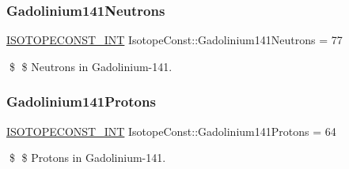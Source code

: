 \subsubsection{\texorpdfstring{Gadolinium141\+Neutrons}{Gadolinium141Neutrons}}
{\footnotesize\ttfamily \mbox{\hyperlink{group___isotope_const-_macros_ga5f18360b3e99483a35c32d789e62621c}{I\+S\+O\+T\+O\+P\+E\+C\+O\+N\+S\+T\+\_\+\+I\+NT}} Isotope\+Const\+::\+Gadolinium141\+Neutrons = 77}

\$ \$ Neutrons in Gadolinium-\/141. \mbox{\label{group___isotope_const-_gadolinium-_gd141_gabe4b22f6970a3dc8afb6d86fd8b4e431}} 
\subsubsection{\texorpdfstring{Gadolinium141\+Protons}{Gadolinium141Protons}}
{\footnotesize\ttfamily \mbox{\hyperlink{group___isotope_const-_macros_ga5f18360b3e99483a35c32d789e62621c}{I\+S\+O\+T\+O\+P\+E\+C\+O\+N\+S\+T\+\_\+\+I\+NT}} Isotope\+Const\+::\+Gadolinium141\+Protons = 64}

\$ \$ Protons in Gadolinium-\/141. 